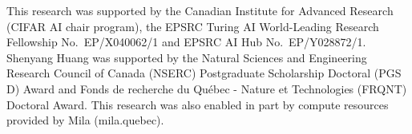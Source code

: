 \begin{acks}
This research was supported by the Canadian Institute for Advanced Research (CIFAR AI chair program), the EPSRC Turing AI World-Leading Research Fellowship No.\ EP/X040062/1 and EPSRC AI Hub No.\ EP/Y028872/1. Shenyang Huang was supported by the Natural Sciences and Engineering Research Council of Canada (NSERC) Postgraduate Scholarship Doctoral (PGS D) Award and Fonds de recherche du Québec - Nature et Technologies (FRQNT) Doctoral Award. This research was also enabled in part by compute resources provided by Mila (mila.quebec).
\end{acks}